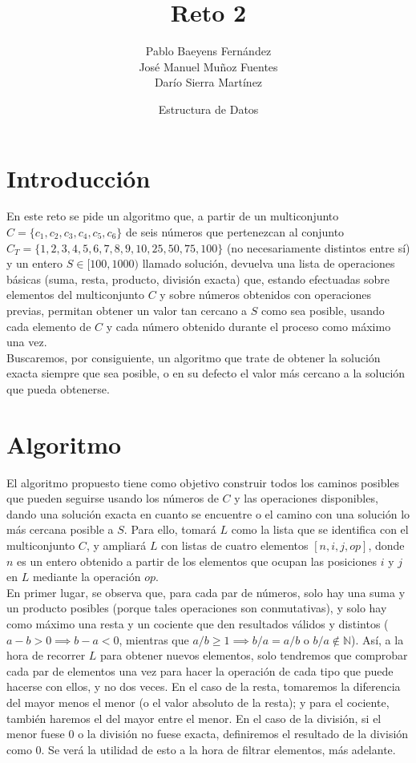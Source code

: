 \documentclass{article}
\title{Reto 2}
\date{Estructura de Datos}
\author{Pablo Baeyens Fernández\\José Manuel Muñoz Fuentes\\Darío Sierra Martínez}
\begin{document}
\maketitle

\section{Introducción}
En este reto se pide un algoritmo que, a partir de un multiconjunto $C = \{c_1,c_2,c_3,c_4,c_5,c_6\}$ de seis números 
que pertenezcan al conjunto $C_T = \{1, 2, 3, 4, 5, 6, 7, 8, 9, 10, 25, 50, 75, 100\}$ (no necesariamente distintos entre sí)
y un entero $S \in [100, 1000)$ llamado solución, devuelva una lista de
operaciones básicas (suma, resta, producto, división exacta) que, estando
efectuadas sobre elementos del multiconjunto $C$ y sobre números obtenidos con
operaciones previas, permitan obtener un valor tan cercano a $S$ como sea
posible, usando cada elemento de $C$ y cada número obtenido durante el proceso como máximo una vez. \\

Buscaremos, por consiguiente, un algoritmo que trate de obtener la solución
exacta siempre que sea posible, o en su defecto el valor más cercano a la solución que
pueda obtenerse.

\section{Algoritmo}
El algoritmo propuesto tiene como objetivo construir todos los caminos posibles que pueden seguirse usando los números de $C$ y las operaciones disponibles, dando una solución exacta en cuanto se encuentre o el camino con una solución lo más cercana posible a $S$. Para ello, tomará $L$ como la lista que se
identifica con el multiconjunto $C$, y ampliará $L$ con listas de cuatro elementos
$[n, i, j, op]$, donde $n$ es un entero obtenido a partir de los elementos que ocupan
las posiciones $i$ y $j$ en $L$ mediante la operación $op$.\\

En primer lugar, se observa que, para cada par de números, solo hay una suma y un producto posibles (porque tales operaciones son conmutativas), y solo hay como máximo una resta y un cociente que den resultados válidos y distintos ($a-b > 0 \implies b - a < 0$, mientras que $a/b \ge 1 \implies b/a = a/b$ o $b/a \notin \mathds N$). Así, a la hora de recorrer $L$ para obtener nuevos elementos, solo tendremos que comprobar cada par de elementos una vez para hacer la operación de cada tipo que puede hacerse con ellos, y no dos veces. En el caso de la resta, tomaremos la diferencia del mayor menos el menor (o el valor absoluto de la resta); y para el cociente, también haremos el del mayor entre el menor. En el caso de la división, si el menor fuese $0$ o la división no fuese exacta, definiremos el resultado de la división como $0$. Se verá la utilidad de esto a la hora de filtrar elementos, más adelante. \\
\end{document}
